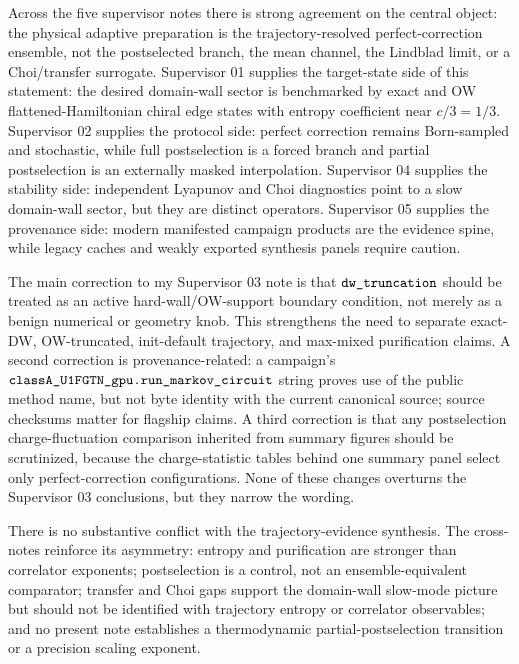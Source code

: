 \documentclass[aps,prb,onecolumn,nofootinbib,superscriptaddress]{revtex4-2}
\newcommand{\src}[1]{\texttt{\detokenize{#1}}}
\begin{document}
Across the five supervisor notes there is strong agreement on the central object: the physical adaptive preparation is the trajectory-resolved perfect-correction ensemble, not the postselected branch, the mean channel, the Lindblad limit, or a Choi/transfer surrogate.  Supervisor 01 supplies the target-state side of this statement: the desired domain-wall sector is benchmarked by exact and OW flattened-Hamiltonian chiral edge states with entropy coefficient near \(c/3=1/3\).  Supervisor 02 supplies the protocol side: perfect correction remains Born-sampled and stochastic, while full postselection is a forced branch and partial postselection is an externally masked interpolation.  Supervisor 04 supplies the stability side: independent Lyapunov and Choi diagnostics point to a slow domain-wall sector, but they are distinct operators.  Supervisor 05 supplies the provenance side: modern manifested campaign products are the evidence spine, while legacy caches and weakly exported synthesis panels require caution.

The main correction to my Supervisor 03 note is that \(\src{dw_truncation}\) should be treated as an active hard-wall/OW-support boundary condition, not merely as a benign numerical or geometry knob.  This strengthens the need to separate exact-DW, OW-truncated, init-default trajectory, and max-mixed purification claims.  A second correction is provenance-related: a campaign's \(\src{classA_U1FGTN_gpu.run_markov_circuit}\) string proves use of the public method name, but not byte identity with the current canonical source; source checksums matter for flagship claims.  A third correction is that any postselection charge-fluctuation comparison inherited from summary figures should be scrutinized, because the charge-statistic tables behind one summary panel select only perfect-correction configurations.  None of these changes overturns the Supervisor 03 conclusions, but they narrow the wording.

There is no substantive conflict with the trajectory-evidence synthesis.  The cross-notes reinforce its asymmetry: entropy and purification are stronger than correlator exponents; postselection is a control, not an ensemble-equivalent comparator; transfer and Choi gaps support the domain-wall slow-mode picture but should not be identified with trajectory entropy or correlator observables; and no present note establishes a thermodynamic partial-postselection transition or a precision scaling exponent.
\end{document}
